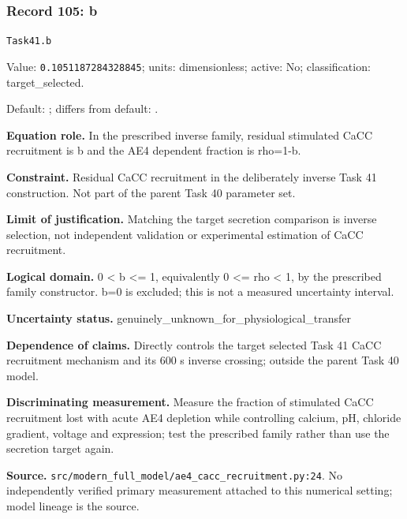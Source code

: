 \subsubsection*{Record 105: b}
{\small \nolinkurl{Task41.b}\par

Value: \texttt{0.1051187284328845}; units: dimensionless; active: No; classification: target\_selected.\par

Default: ; differs from default: .\par

\textbf{Equation role.} In the prescribed inverse family, residual stimulated CaCC recruitment is b and the AE4 dependent fraction is rho=1-b.\par

\textbf{Constraint.} Residual CaCC recruitment in the deliberately inverse Task 41 construction. Not part of the parent Task 40 parameter set.\par

\textbf{Limit of justification.} Matching the target secretion comparison is inverse selection, not independent validation or experimental estimation of CaCC recruitment.\par

\textbf{Logical domain.} 0 < b <= 1, equivalently 0 <= rho < 1, by the prescribed family constructor. b=0 is excluded; this is not a measured uncertainty interval.\par

\textbf{Uncertainty status.} genuinely\_unknown\_for\_physiological\_transfer\par

\textbf{Dependence of claims.} Directly controls the target selected Task 41 CaCC recruitment mechanism and its 600 s inverse crossing; outside the parent Task 40 model.\par

\textbf{Discriminating measurement.} Measure the fraction of stimulated CaCC recruitment lost with acute AE4 depletion while controlling calcium, pH, chloride gradient, voltage and expression; test the prescribed family rather than use the secretion target again.\par

\textbf{Source.} \nolinkurl{src/modern_full_model/ae4_cacc_recruitment.py:24}. No independently verified primary measurement attached to this numerical setting; model lineage is the source.\par}

